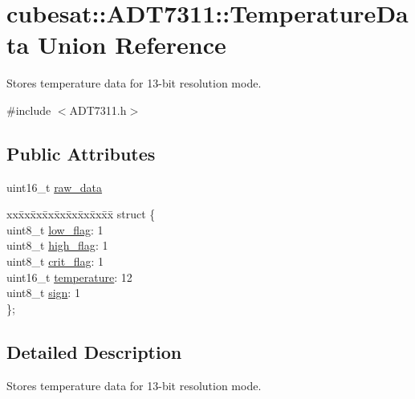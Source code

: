 \hypertarget{unioncubesat_1_1ADT7311_1_1TemperatureData}{}\section{cubesat\+:\+:A\+D\+T7311\+:\+:Temperature\+Data Union Reference}
\label{unioncubesat_1_1ADT7311_1_1TemperatureData}


Stores temperature data for 13-\/bit resolution mode.  




{\ttfamily \#include $<$A\+D\+T7311.\+h$>$}

\subsection*{Public Attributes}
\begin{DoxyCompactItemize}
\item 
uint16\+\_\+t \hyperlink{unioncubesat_1_1ADT7311_1_1TemperatureData_ad6e4e6f6ab1c4ad7c4b0aa9edff3b9ab}{raw\+\_\+data}
\item 
\begin{tabbing}
xx\=xx\=xx\=xx\=xx\=xx\=xx\=xx\=xx\=\kill
struct \{\\
\>uint8\_t \hyperlink{unioncubesat_1_1ADT7311_1_1TemperatureData_aa84035bd9ee39fca394d9c116b7adbfb}{low\_flag}: 1\\
\>uint8\_t \hyperlink{unioncubesat_1_1ADT7311_1_1TemperatureData_a6c526b1936ed75ba12c11253961b04f6}{high\_flag}: 1\\
\>uint8\_t \hyperlink{unioncubesat_1_1ADT7311_1_1TemperatureData_a5dc81f911845bc7e4572eaf0d585f0f0}{crit\_flag}: 1\\
\>uint16\_t \hyperlink{unioncubesat_1_1ADT7311_1_1TemperatureData_a13d1b160102ddfb60a5d48b9a57b4e0a}{temperature}: 12\\
\>uint8\_t \hyperlink{unioncubesat_1_1ADT7311_1_1TemperatureData_acce8ba4b4b37829bb6ba63f6563b7f66}{sign}: 1\\
\}; \\

\end{tabbing}\end{DoxyCompactItemize}


\subsection{Detailed Description}
Stores temperature data for 13-\/bit resolution mode. 

